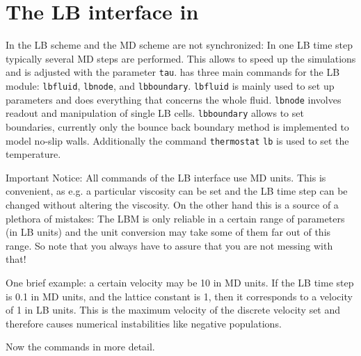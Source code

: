 

\chapter{The LB interface in \ES{}}
In \ES{} the LB scheme and the MD scheme are not synchronized: In one
LB time step typically several MD steps are performed. This allows to speed
up the simulations and is adjusted with the parameter \lstinline|tau|.
\ES{} has three main commands for the LB module: 
 \lstinline|lbfluid|,  \lstinline|lbnode|, and  \lstinline|lbboundary|.
 \lstinline|lbfluid| is mainly used to set up parameters and does everything that
concerns the whole fluid.  \lstinline|lbnode| involves readout and manipulation of
single LB cells.  \lstinline|lbboundary| allows to set boundaries, currently only
the bounce back boundary method is implemented to model
no-slip walls. Additionally the command  \lstinline|thermostat| \lstinline|lb| is used to set
the temperature. 

Important Notice: All commands of the LB interface use
MD units. This is convenient, as e.g. a particular 
viscosity can be set and the LB time step can be changed without
altering the viscosity. On the other hand this is a source
of a plethora of mistakes: The LBM is only reliable in a certain 
range of parameters (in LB units) and the unit conversion
may take some of them far out of this range. So note that you always
have to assure that you are not messing with that!

One brief example: a certain velocity may be 10 in MD units.
If the LB time step is 0.1 in MD units, and the lattice constant
is 1, then it corresponds to a velocity of 1 in LB units. 
This is the maximum velocity of the discrete velocity set and therefore
causes numerical instabilities like negative populations.

Now the commands in more detail.

